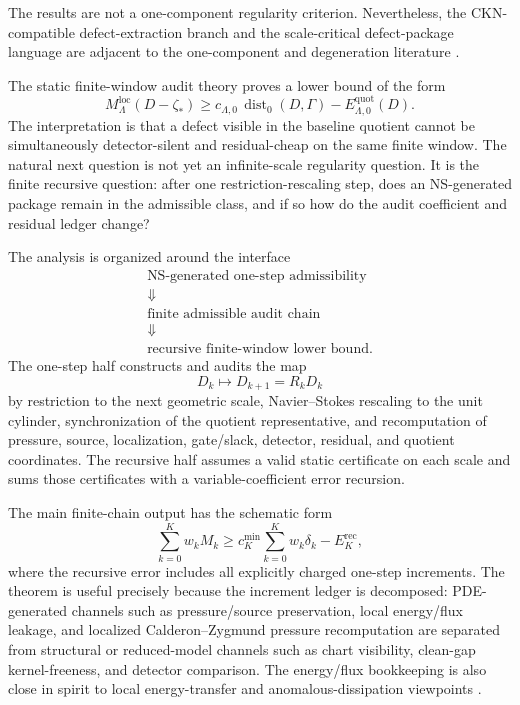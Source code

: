 \documentclass[11pt]{article}
\numberwithin{equation}{section}
\theoremstyle{plain}
\theoremstyle{definition}
\theoremstyle{remark}
\newcommand{\loc}{\mathrm{loc}}
\newcommand{\quot}{\mathrm{quot}}
\newcommand{\dist}{\operatorname{dist}}
\begin{document}
The results are not a one-component regularity criterion.  Nevertheless, the CKN-compatible defect-extraction branch and the scale-critical defect-package language are adjacent to the one-component and degeneration literature \cite{KukavicaZiane2006,CaoTiti2011,CheminZhang2016,CheminZhangZhang2017,HanLeiLiZhao2019,KangNguyen2023,YuOneComponent2026,YuStrict2026,YuSchur2026,YuInvisible2026}.

The static finite-window audit theory \cite{YuSingularityAuditTransfer2026,YuComputationalAntiPhantom2026} proves a lower bound of the form
\begin{equation}\label{eq:static-audit-fw}
  M_{\Lambda}^{\loc}(D-\zeta_*)
  \ge
  c_{\Lambda,0}\,\dist_0(D,\Gamma)
  - E_{\Lambda,0}^{\quot}(D).
\end{equation}
The interpretation is that a defect visible in the baseline quotient cannot be simultaneously detector-silent and residual-cheap on the same finite window.  The natural next question is not yet an infinite-scale regularity question.  It is the finite recursive question: after one restriction-rescaling step, does an NS-generated package remain in the admissible class, and if so how do the audit coefficient and residual ledger change?

The analysis is organized around the interface
\[
\begin{array}{c}
  \boxed{\text{NS-generated one-step admissibility}}\\[0.35em]
  \Downarrow\\[0.35em]
  \boxed{\text{finite admissible audit chain}}\\[0.35em]
  \Downarrow\\[0.35em]
  \boxed{\text{recursive finite-window lower bound}}.
\end{array}
\]
The one-step half constructs and audits the map
\[
  D_k \longmapsto D_{k+1}=R_kD_k
\]
by restriction to the next geometric scale, Navier--Stokes rescaling to the unit cylinder, synchronization of the quotient representative, and recomputation of pressure, source, localization, gate/slack, detector, residual, and quotient coordinates.  The recursive half assumes a valid static certificate on each scale and sums those certificates with a variable-coefficient error recursion.

The main finite-chain output has the schematic form
\[
  \sum_{k=0}^K w_k M_k
  \ge
  c_K^{\min}\sum_{k=0}^K w_k\delta_k
  - E_K^{\mathrm{rec}},
\]
where the recursive error includes all explicitly charged one-step increments.  The theorem is useful precisely because the increment ledger is decomposed: PDE-generated channels such as pressure/source preservation, local energy/flux leakage, and localized Calderon--Zygmund pressure recomputation are separated from structural or reduced-model channels such as chart visibility, clean-gap kernel-freeness, and detector comparison.  The energy/flux bookkeeping is also close in spirit to local energy-transfer and anomalous-dissipation viewpoints \cite{ConstantinETiti1994,Eyink1994,DuchonRobert2000,BarkerPrange2021}.
\end{document}
